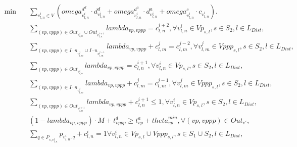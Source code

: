 \begin{align}
  \min\quad & \sum_{v_{l , n}^{i} \in V} \left(\mathit{omega}_{v_{l , n}^{i}}^{d^{d}} \cdot d_{v_{l , n}^{i}}^{d} + \mathit{omega}_{v_{l , n}^{i}}^{d^{a}} \cdot d_{v_{l , n}^{i}}^{a} + \mathit{omega}_{v_{l , n}^{i}}^{c} \cdot c_{v_{l , n}^{i}}\right) . \tag{eq\_0003} \\
  & \underset{\left(vp , vppp\right) \in \mathit{Out}_{v_{l , n}^{i}} \cup \mathit{Out}_{v_{l , n}^{i + 1}}}{\sum} \mathit{lambda}_{vp , vppp} = c_{l , n}^{i + 2} , \forall v_{l , n}^{i} \in Vp_{s , l} , s \in S_{2} , l \in L_{D i s t} , \tag{eq\_0004} \\
  & \underset{\left(vp , vppp\right) \in I \cdot n_{v_{l , m}^{j}} \cup I \cdot n_{v_{l , m}^{j - 1}}}{\sum} \mathit{lambda}_{vp , vppp} + c_{l , m}^{j} = c_{l , m}^{j - 2} , \forall v_{l , m}^{j} \in Vppp_{s , l} , s \in S_{2} , l \in L_{D i s t} , \tag{eq\_0005} \\
  & \underset{\left(vp , vppp\right) \in \mathit{Out}_{v_{l , n}^{i}}}{\sum} \mathit{lambda}_{vp , vppp} = c_{l , n}^{i + 1} , \forall v_{l , n}^{i} \in Vp_{s , l} , s \in S_{2} , l \in L_{D i s t} , \tag{eq\_0006} \\
  & \underset{\left(vp , vppp\right) \in I \cdot n_{v_{l , m}^{j}}}{\sum} \mathit{lambda}_{vp , vppp} + c_{l , m}^{j} = c_{l , m}^{j - 1} , \forall v_{l , m}^{j} \in Vppp_{s , l} , s \in S_{2} , l \in L_{D i s t} , \tag{eq\_0007} \\
  & \underset{\left(vp , vppp\right) \in \mathit{Out}_{v_{l , n}^{i + 1}}}{\sum} \mathit{lambda}_{vp , vppp} + c_{l , n}^{i + 1} \leq 1 , \forall v_{l , n}^{i} \in Vp_{s , l} , s \in S_{2} , l \in L_{D i s t} , \tag{eq\_0008} \\
  & \left(1 - \mathit{lambda}_{vp , vppp}\right) \cdot M + t_{vppp}^{d} \geq t_{vp}^{a} + \mathit{theta}_{vp}^{m i n} , \forall \left(vp , vppp\right) \in \mathit{Out}_{v '} , \tag{eq\_0009} \\
  & \underset{q \in P_{s , v_{l , n}^{i}}}{\sum} p_{v_{l , n}^{i} , q} + c_{l , n}^{i} = 1 \forall v_{l , n}^{i} \in Vp_{s , l} \cup Vppp_{s , l} , s \in S_{1} \cup S_{2} , l \in L_{D i s t} , \tag{eq\_0010} \\
\end{align}
